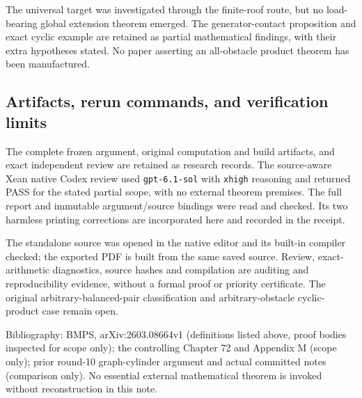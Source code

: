 \documentclass[
  10pt,
]{article}
\begin{document}
The universal target was investigated through the finite-roof route, but
no load-bearing global extension theorem emerged. The generator-contact
proposition and exact cyclic example are retained as partial
mathematical findings, with their extra hypotheses stated. No paper
asserting an all-obstacle product theorem has been manufactured.

\subsection{Artifacts, rerun commands, and verification
limits}\label{artifacts-rerun-commands-and-verification-limits}

The complete frozen argument, original computation and build artifacts,
and exact independent review are retained as research records. The
source-aware Xean native Codex review used \texttt{gpt-6.1-sol} with
\texttt{xhigh} reasoning and returned PASS for the stated partial
scope, with no external theorem premises. The full report and immutable
argument/source bindings were read and checked. Its two harmless
printing corrections are incorporated here and recorded in the receipt.

The standalone source was opened in the native editor and its built-in
compiler checked; the exported PDF is built from the same saved source.
Review, exact-arithmetic diagnostics, source hashes and compilation are
auditing and reproducibility evidence, without a formal proof or priority
certificate. The original arbitrary-balanced-pair classification and
arbitrary-obstacle cyclic-product case remain open.

Bibliography: BMPS, arXiv:2603.08664v1 (definitions listed above, proof
bodies inspected for scope only); the controlling Chapter 72 and
Appendix M (scope only); prior round-10 graph-cylinder argument and
actual committed notes (comparison only). No essential external
mathematical theorem is invoked without reconstruction in this note.
\end{document}
